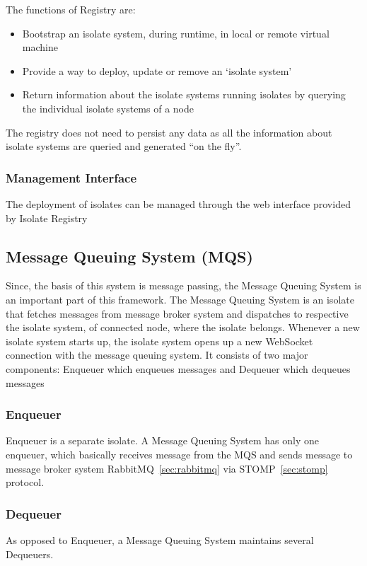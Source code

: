 The functions of Registry are:
\begin{itemize}
  \item Bootstrap an isolate system, during runtime, in local or remote virtual machine
  \item Provide a way to deploy, update or remove an ‘isolate system’
  \item Return information about the isolate systems running isolates by querying the individual isolate systems of a node
\end{itemize}
The registry does not need to persist any data as all the information about isolate systems are queried and generated “on the fly”.

  \subsubsection{Management Interface}
  The deployment of isolates can be managed through the web interface provided by Isolate Registry

\subsection{Message Queuing System (MQS)}
Since, the basis of this system is message passing, the Message Queuing System is an important part of this framework. The Message Queuing System is an isolate that fetches messages from message broker system and dispatches to respective the isolate system, of connected node, where the isolate belongs. Whenever a new isolate system starts up, the isolate system opens up a new WebSocket connection with the message queuing system.
It consists of two major components: Enqueuer \textendash{} which enqueues messages and Dequeuer \textendash{} which dequeues messages
  \subsubsection{Enqueuer}
  Enqueuer is a separate isolate. A Message Queuing System has only one enqueuer, which basically receives message from the MQS and sends message to message broker system \textendash{} RabbitMQ~\ref{sec:rabbitmq} via STOMP~\ref{sec:stomp} protocol.

  \subsubsection{Dequeuer}
  As opposed to Enqueuer, a Message Queuing System maintains several Dequeuers.

